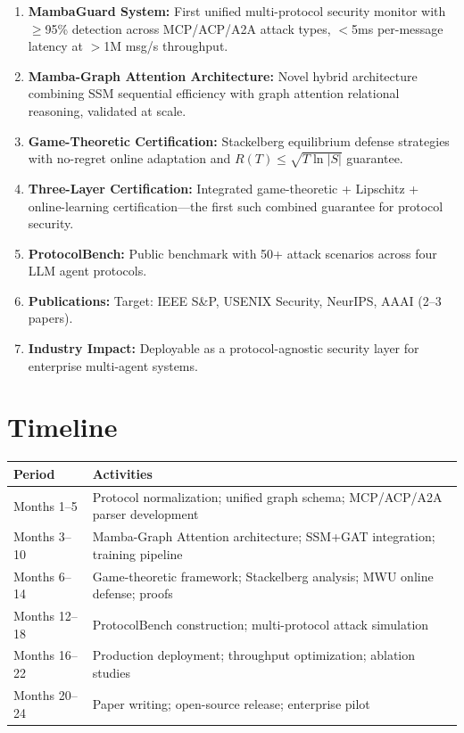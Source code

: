\documentclass[12pt,a4paper]{article}
\begin{document}
\begin{enumerate}
    \item \textbf{MambaGuard System:} First unified multi-protocol security monitor with $\geq$95\% detection across MCP/ACP/A2A attack types, $<$5ms per-message latency at $>$1M msg/s throughput.
    
    \item \textbf{Mamba-Graph Attention Architecture:} Novel hybrid architecture combining SSM sequential efficiency with graph attention relational reasoning, validated at scale.
    
    \item \textbf{Game-Theoretic Certification:} Stackelberg equilibrium defense strategies with no-regret online adaptation and $R(T) \leq \sqrt{T \ln |S|}$ guarantee.
    
    \item \textbf{Three-Layer Certification:} Integrated game-theoretic + Lipschitz + online-learning certification---the first such combined guarantee for protocol security.
    
    \item \textbf{ProtocolBench:} Public benchmark with 50+ attack scenarios across four LLM agent protocols.
    
    \item \textbf{Publications:} Target: IEEE S\&P, USENIX Security, NeurIPS, AAAI (2--3 papers).
    
    \item \textbf{Industry Impact:} Deployable as a protocol-agnostic security layer for enterprise multi-agent systems.
\end{enumerate}

\section{Timeline}

\begin{table}[H]
\centering
\begin{tabularx}{\textwidth}{@{}lX@{}}
\toprule
\textbf{Period} & \textbf{Activities} \\
\midrule
Months 1--5 & Protocol normalization; unified graph schema; MCP/ACP/A2A parser development \\
Months 3--10 & Mamba-Graph Attention architecture; SSM+GAT integration; training pipeline \\
Months 6--14 & Game-theoretic framework; Stackelberg analysis; MWU online defense; proofs \\
Months 12--18 & ProtocolBench construction; multi-protocol attack simulation \\
Months 16--22 & Production deployment; throughput optimization; ablation studies \\
Months 20--24 & Paper writing; open-source release; enterprise pilot \\
\bottomrule
\end{tabularx}
\end{table}
\end{document}
